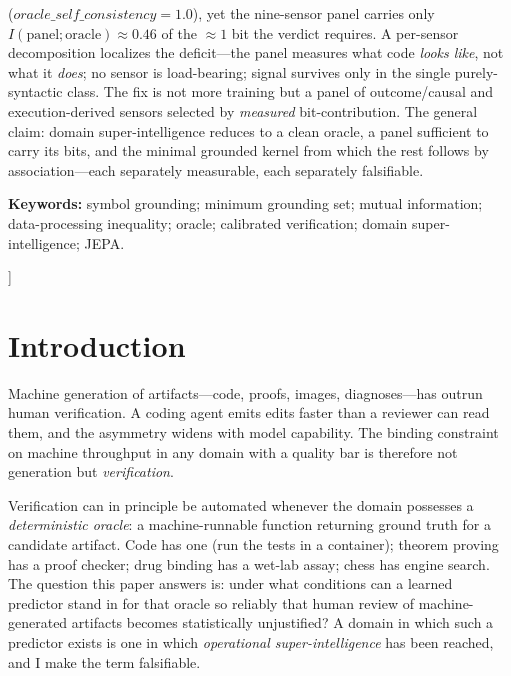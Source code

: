 \documentclass[10pt,twocolumn]{article}
\begin{document}
\begin{@twocolumnfalse}
\begin{center}
\begin{minipage}{0.93\textwidth}
($\textit{oracle\_self\_consistency}=1.0$), yet the nine-sensor panel carries only
$I(\text{panel};\text{oracle})\approx0.46$ of the ${\approx}1$ bit the verdict
requires. A per-sensor decomposition localizes the deficit---the panel measures
what code \emph{looks like}, not what it \emph{does}; no sensor is load-bearing;
signal survives only in the single purely-syntactic class. The fix is not more
training but a panel of outcome/causal and execution-derived sensors selected by
\emph{measured} bit-contribution. The general claim: domain super-intelligence
reduces to a clean oracle, a panel sufficient to carry its bits, and the minimal
grounded kernel from which the rest follows by association---each separately
measurable, each separately falsifiable.

\vspace{0.6em}
\noindent\textbf{Keywords:} symbol grounding; minimum grounding set; mutual
information; data-processing inequality; oracle; calibrated verification;
domain super-intelligence; JEPA.
\vspace{1.0em}

\end{minipage}
\end{center}
\end{@twocolumnfalse}
]

\section{Introduction}
\label{sec:intro}

Machine generation of artifacts---code, proofs, images, diagnoses---has outrun
human verification. A coding agent emits edits faster than a reviewer can read
them, and the asymmetry widens with model capability. The binding constraint on
machine throughput in any domain with a quality bar is therefore not generation
but \emph{verification}.

Verification can in principle be automated whenever the domain possesses a
\emph{deterministic oracle}: a machine-runnable function returning ground truth
for a candidate artifact. Code has one (run the tests in a container); theorem
proving has a proof checker; drug binding has a wet-lab assay; chess has engine
search. The question this paper answers is: under what conditions can a learned
predictor stand in for that oracle so reliably that human review of
machine-generated artifacts becomes statistically unjustified? A domain in which
such a predictor exists is one in which \emph{operational super-intelligence} has
been reached, and I make the term falsifiable.
\end{document}
